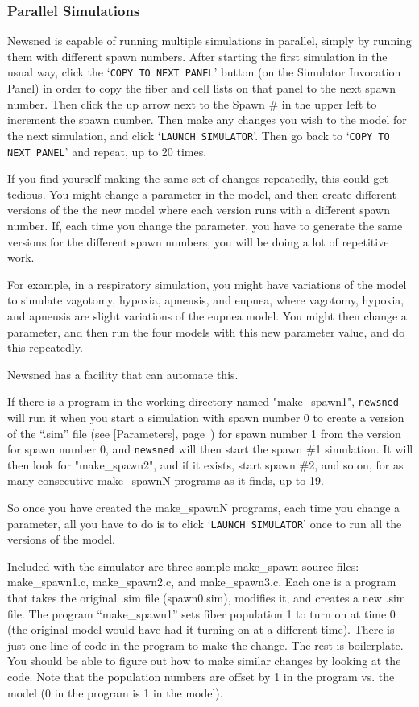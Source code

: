 \documentclass[12pt,openany,oneside]{book}
\newcommand{\ticommand}[1]{\texttt{#1}}
\newcommand{\tisamp}[1]{`\texttt{#1}'}
\newcommand{\tipxref}[1]{see [#1], page~\pageref{#1}}
\begin{document}
\subsubsection{Parallel Simulations}

Newsned is capable of running multiple simulations in parallel, simply
by running them with different spawn numbers.  After starting the
first simulation in the usual way, click the \tisamp{COPY TO NEXT PANEL}
button (on the Simulator Invocation Panel) in order to copy the fiber
and cell lists on that panel to the next spawn number.  Then click the
up arrow next to the Spawn \# in the upper left to increment the spawn
number.  Then make any changes you wish to the model for the next
simulation, and click \tisamp{LAUNCH SIMULATOR}.  Then go back to \tisamp{COPY TO
NEXT PANEL} and repeat, up to 20 times.

If you find yourself making the same set of changes repeatedly, this
could get tedious.  You might change a parameter in the model, and
then create different versions of the the new model where each version
runs with a different spawn number.  If, each time you change the
parameter, you have to generate the same versions for the different
spawn numbers, you will be doing a lot of repetitive work.

For example, in a respiratory simulation, you might have variations of
the model to simulate vagotomy, hypoxia, apneusis, and eupnea, where
vagotomy, hypoxia, and apneusis are slight variations of the eupnea
model.  You might then change a parameter, and then run the four
models with this new parameter value, and do this repeatedly.

Newsned has a facility that can automate this.

If there is a program in the working directory named "make\_spawn1",
\ticommand{newsned} will run it when you start a simulation with spawn number 0 to
create a version of the ``.sim'' file (\tipxref{Parameters}) for spawn
number 1 from the version for spawn number 0, and \ticommand{newsned} will then
start the spawn \#1 simulation.  It will then look for "make\_spawn2",
and if it exists, start spawn \#2, and so on, for as many consecutive
make\_spawnN programs as it finds, up to 19.

So once you have created the make\_spawnN programs, each time you
change a parameter, all you have to do is to click \tisamp{LAUNCH SIMULATOR}
once to run all the versions of the model.

Included with the simulator are three sample make\_spawn source files:
make\_spawn1.c, make\_spawn2.c, and make\_spawn3.c.  Each one is a
program that takes the original .sim file (spawn0.sim), modifies it,
and creates a new .sim file.  The program ``make\_spawn1'' sets fiber
population 1 to turn on at time 0 (the original model would have had
it turning on at a different time).  There is just one line of code in
the program to make the change.  The rest is boilerplate.  You should
be able to figure out how to make similar changes by looking at the
code.  Note that the population numbers are offset by 1 in the program
vs. the model (0 in the program is 1 in the model).
\end{document}
